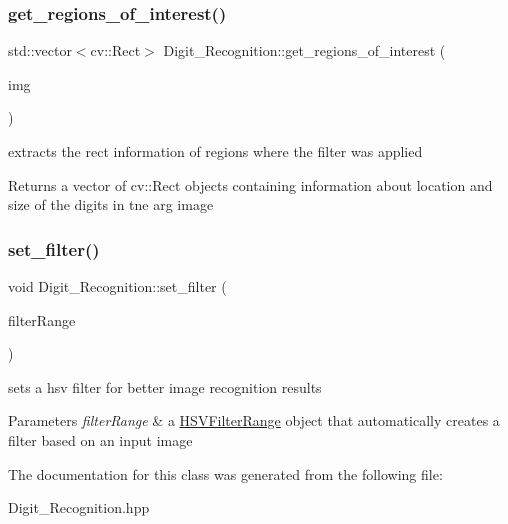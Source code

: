 \subsubsection{\texorpdfstring{get\+\_\+regions\+\_\+of\+\_\+interest()}{get\_regions\_of\_interest()}}
{\footnotesize\ttfamily std\+::vector$<$cv\+::\+Rect$>$ Digit\+\_\+\+Recognition\+::get\+\_\+regions\+\_\+of\+\_\+interest (\begin{DoxyParamCaption}\item[{cv\+::\+Mat \&}]{img }\end{DoxyParamCaption})}



extracts the rect information of regions where the filter was applied 

\begin{DoxyReturn}{Returns}
a vector of cv\+::\+Rect objects containing information about location and size of the digits in tne arg image 
\end{DoxyReturn}
\mbox{\label{class_digit___recognition_a68484f6730ee2f0fc2050726c3ff2252}} 
\subsubsection{\texorpdfstring{set\+\_\+filter()}{set\_filter()}}
{\footnotesize\ttfamily void Digit\+\_\+\+Recognition\+::set\+\_\+filter (\begin{DoxyParamCaption}\item[{\mbox{\hyperlink{struct_h_s_v_filter_range}{H\+S\+V\+Filter\+Range}}}]{filter\+Range }\end{DoxyParamCaption})}



sets a hsv filter for better image recognition results 


\begin{DoxyParams}{Parameters}
{\em filter\+Range} & a \mbox{\hyperlink{struct_h_s_v_filter_range}{H\+S\+V\+Filter\+Range}} object that automatically creates a filter based on an input image \\
\hline
\end{DoxyParams}


The documentation for this class was generated from the following file\+:\begin{DoxyCompactItemize}
\item 
Digit\+\_\+\+Recognition.\+hpp\end{DoxyCompactItemize}
